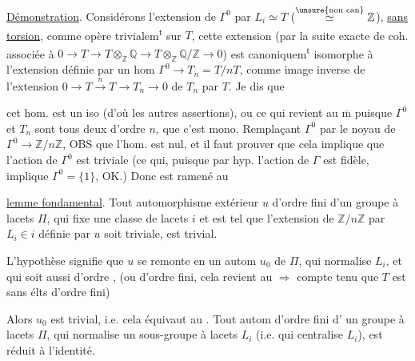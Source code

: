 \uline{Démonstration}. Considérons l'extension
 de $\Gamma^0$ par $L_i\simeq T$ ($\overset{\text{\unsure{non can}}}{\simeq}\mathbb Z$), \uline{sans torsion},
comme  opère trivialem\textsuperscript{t} sur $T$, cette
extension (par la suite exacte de coh.
associée à $0\to T\to T\otimes_{\mathbb Z}\mathbb Q\to T\otimes_{\mathbb Z}\mathbb Q/\mathbb Z\to0$)
est canoniquem\textsuperscript{t} isomorphe à  l'extension
définie par un hom $\Gamma^0\to T_n=T/nT$,
comme image inverse de l'extension
$0\to T\xrightarrow{n}T\to T_n\to0$ de $T_n$ par $T$. Je dis que


cet hom. est un iso (d'où 
les autres assertions), ou ce qui revient
au $\overline{\mathrm m}$ puisque $\Gamma^0$ et $T_n$ sont tous
deux d'ordre $n$, que c'est mono.
Remplaçant $\Gamma^0$ par le noyau de $\Gamma^0\to\mathbb Z/n\mathbb Z$,
OBS que l'hom.  est nul, et il faut
prouver que cela implique que l'action
de $\Gamma^0$ est triviale (ce qui, puisque par hyp.
l'action de $\Gamma$ est fidèle, implique $\Gamma^0=\{1\}$,
OK.) Donc  est ramené au

\uline{lemme fondamental}. Tout automorphisme
extérieur $u$ d'ordre fini  d'un groupe à
lacets $\Pi$, qui fixe une classe de lacets
$i$ et est tel que l'extension de $\mathbb Z/n\mathbb Z$
par $L_i\in i$ définie par $u$ soit triviale,
est trivial.

L'hypothèse signifie que $u$ se remonte
en un autom $u_0$ de $\Pi$, qui
normalise $L_i$, et qui soit aussi d'ordre ,
(ou d'ordre fini, cela revient au $\Rightarrow$ compte tenu
que  $T$ est sans élts d'ordre fini)


Alors $u_0$ est trivial, i.e. cela équivaut au
\uline{}. Tout autom  d'ordre fini d'
un groupe à lacets $\Pi$,  qui normalise
un sous-groupe à lacets $L_i$ (i.e. qui
centralise $L_i$), est réduit à l'identité.

